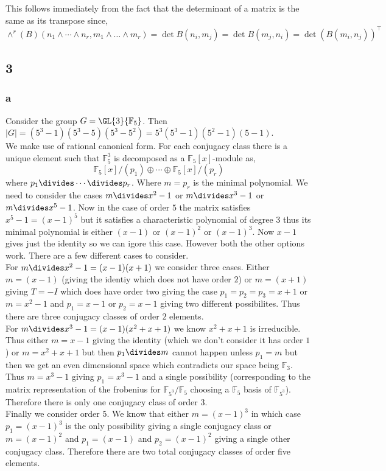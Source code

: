 \documentclass[12pt]{article}
\renewcommand{\F}{\mathbb{F}}
\begin{document}
This follows immediately from the fact that the determinant of a matrix is the same as its transpose since,
\[ \wedge^r(B)(n_1 \wedge \cdots \wedge n_r, m_1 \wedge \dots \wedge m_r) = \det{B(n_i, m_j)} = \det{B(m_j, n_i)} = \det{(B(m_i, n_j))^\top} \]


\subsection{3}

\subsubsection{a}

Consider the group $G = \GL{3}{\F_5}$. Then $|G| = (5^3 - 1)(5^3 - 5)(5^3 - 5^2) = 5^3 (5^3 - 1)(5^2 - 1)(5 - 1)$.  
\bigskip\\
We make use of rational canonical form. For each conjugacy class there is a unique element such that $\F_5^3$ is decomposed as a $\F_5[x]$-module as,
\[ \F_5[x]/(p_1) \oplus \cdots \oplus \F_5[x]/(p_r) \]
where $p_1 \divides \cdots \divides p_r$. 
Where $m = p_r$ is the minimal polynomial. We need to consider the cases $m \divides x^2 - 1$ or $m \divides x^3 - 1$ or $m \divides x^5 - 1$. Now in the case of order $5$ the matrix satisfies $x^5 - 1 = (x - 1)^5$ but it satisfies a characteristic polynomial of degree $3$ thus its minimal polynomial is either $(x - 1)$ or $(x - 1)^2$ or $(x - 1)^3$. Now $x - 1$ gives just the identity so we can igore this case. However both the other options work. There are a few different cases to consider.
\bigskip\\
For $m \divides x^2 - 1 = (x - 1)(x + 1)$ we consider three cases. Either $m = (x - 1)$ (giving the identiy which does not have order $2$) or $m = (x + 1)$ giving $T = -I$ which does have order two giving the case $p_1 = p_2 = p_3 = x + 1$ or $m = x^2 - 1$ and $p_1 = x - 1$ or $p_2 = x - 1$ giving two different possibilites. Thus there are three conjugacy classes of order $2$ elements.
\bigskip\\
For $m \divides x^3 - 1 = (x - 1)(x^2 + x + 1)$ we know $x^2 + x + 1$ is irreducible. Thus either $m = x - 1$ giving the identity (which we don't consider it has order $1$) or $m = x^2 + x + 1$ but then $p_1 \divides m$ cannot happen unless $p_1 = m$ but then we get an even dimensional space which contradicts our space being $\F_3$. Thus $m = x^3 - 1$ giving $p_1 = x^3 - 1$ and a single possibility (corresponding to the matrix representation of the frobenius for $\F_{5^3} / \F_5$ choosing a $\F_5$ basis of $\F_{5^3}$). Therefore there is only one conjugacy class of order $3$.
\bigskip\\
Finally we consider order $5$. We know that either $m = (x - 1)^3$ in which case $p_1 = (x - 1)^3$ is the only possibility giving a single conjugacy class or $m = (x - 1)^2$ and $p_1 = (x-1)$ and $p_2 = (x-1)^2$ giving a single other conjugacy class. Therefore there are two total conjugacy classes of order five elements.
\end{document}
